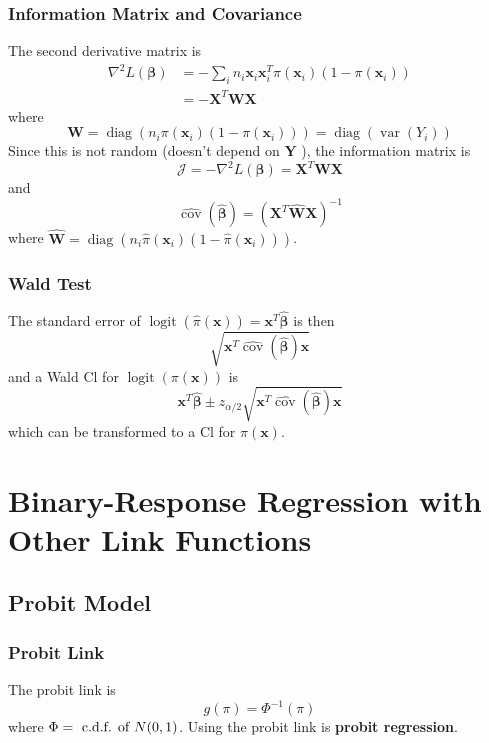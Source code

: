 \documentclass[11pt]{elegantbook}
\begin{document}
\subsection*{Information Matrix and Covariance}
The second derivative matrix is
$$
\begin{aligned}
\nabla^2 L(\boldsymbol{\beta}) & =-\sum_i n_i \boldsymbol{x}_i \boldsymbol{x}_i^T \pi\left(\boldsymbol{x}_i\right)\left(1-\pi\left(\boldsymbol{x}_i\right)\right) \\
& =-\boldsymbol{X}^T \boldsymbol{W} \boldsymbol{X}
\end{aligned}
$$
where
$$
\boldsymbol{W}=\operatorname{diag}\left(n_i \pi\left(\boldsymbol{x}_i\right)\left(1-\pi\left(\boldsymbol{x}_i\right)\right)\right)=\operatorname{diag}\left(\operatorname{var}\left(Y_i\right)\right)
$$
Since this is not random (doesn't depend on $\boldsymbol{Y}$ ), the information matrix is
$$
\mathcal{J}=-\nabla^2 L(\boldsymbol{\beta})=\boldsymbol{X}^T \boldsymbol{W} \boldsymbol{X}
$$
and
$$
\widehat{\operatorname{cov}}(\hat{\boldsymbol{\beta}})=\left(\boldsymbol{X}^T \hat{\boldsymbol{W}} \boldsymbol{X}\right)^{-1}
$$
where $\hat{\boldsymbol{W}}=\operatorname{diag}\left(n_i \hat{\pi}\left(\boldsymbol{x}_i\right)\left(1-\hat{\pi}\left(\boldsymbol{x}_i\right)\right)\right)$.


\subsection*{Wald Test}
The standard error of $\operatorname{logit}(\hat{\pi}(\boldsymbol{x}))=\boldsymbol{x}^T \hat{\boldsymbol{\beta}}$ is then
$$
\sqrt{\boldsymbol{x}^T \widehat{\operatorname{cov}}(\hat{\boldsymbol{\beta}}) \boldsymbol{x}}
$$
and a Wald Cl for $\operatorname{logit}(\pi(\boldsymbol{x}))$ is
$$
\boldsymbol{x}^T \hat{\boldsymbol{\beta}} \pm z_{\alpha / 2} \sqrt{\boldsymbol{x}^T \widehat{\operatorname{cov}}(\hat{\boldsymbol{\beta}}) \boldsymbol{x}}
$$
which can be transformed to a $\mathrm{Cl}$ for $\pi(\boldsymbol{x})$.

\chapter{Binary-Response Regression with Other Link Functions}
\section{Probit Model}
\subsection{Probit Link}
The probit link is $$g(\pi)=\Phi^{-1}(\pi)$$ where $\Phi = \textnormal{ c.d.f. of }N(0,1)$. Using the probit link is \textbf{probit regression}.
\end{document}

